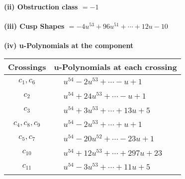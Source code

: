 \documentclass[1p]{elsarticle_modified}
\theoremstyle{definition}
\begin{document}
\flushleft \textbf{(ii) Obstruction class $= -1$}\\~\\
\flushleft \textbf{(iii) Cusp Shapes $= -4 u^{53}+96 u^{51}+\cdots+12 u-10$}\\~\\
\newpage\renewcommand{\arraystretch}{1}
\flushleft \textbf{(iv) u-Polynomials at the component}\newline \\
\begin{tabular}{m{50pt}|m{274pt}}
Crossings & \hspace{64pt}u-Polynomials at each crossing \\
\hline $$\begin{aligned}c_{1},c_{6}\end{aligned}$$&$\begin{aligned}
&u^{54}-2 u^{53}+\cdots- u+1
\end{aligned}$\\
\hline $$\begin{aligned}c_{2}\end{aligned}$$&$\begin{aligned}
&u^{54}+24 u^{53}+\cdots- u+1
\end{aligned}$\\
\hline $$\begin{aligned}c_{3}\end{aligned}$$&$\begin{aligned}
&u^{54}+3 u^{53}+\cdots+13 u+5
\end{aligned}$\\
\hline $$\begin{aligned}c_{4},c_{8},c_{9}\end{aligned}$$&$\begin{aligned}
&u^{54}-2 u^{53}+\cdots+u+1
\end{aligned}$\\
\hline $$\begin{aligned}c_{5},c_{7}\end{aligned}$$&$\begin{aligned}
&u^{54}-20 u^{52}+\cdots-23 u+1
\end{aligned}$\\
\hline $$\begin{aligned}c_{10}\end{aligned}$$&$\begin{aligned}
&u^{54}+12 u^{53}+\cdots+297 u+23
\end{aligned}$\\
\hline $$\begin{aligned}c_{11}\end{aligned}$$&$\begin{aligned}
&u^{54}-3 u^{53}+\cdots+11 u+5
\end{aligned}$\\
\hline
\end{tabular}\\~\\
\end{document}
